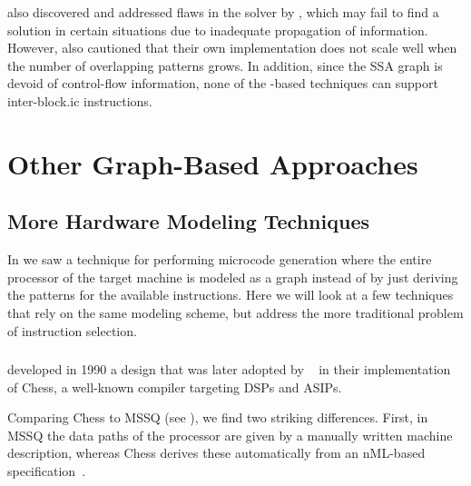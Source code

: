\citeauthor{BuchwaldZwinkau:2010} also discovered and addressed flaws in the
 solver by \citeauthor{EcksteinEtAl:2003}, which may fail to find a
solution in certain situations due to inadequate propagation of information.
%
However, \citeauthor{BuchwaldZwinkau:2010} also cautioned that their own implementation
does not scale well when the number of overlapping \glspl{pattern} grows.
%
In addition, since the \gls{SSA graph} is devoid of control-flow information,
none of the -based techniques can support \gls{inter-block.ic}
\glspl{instruction}.


\section{Other Graph-Based Approaches}

\subsection{More Hardware Modeling Techniques}

In  we saw a technique for performing \gls{microcode
  generation} where the entire processor of the \gls{target machine} is modeled
as a \gls{graph} instead of by just deriving the \glspl{pattern} for the
available \glspl{instruction}.
%
Here we will look at a few techniques that rely on the same modeling scheme, but
address the more traditional problem of \gls{instruction selection}.


\subsubsection{}

\textcite{LanneerEtAl:1990} developed in 1990 a design that was later adopted by
\citeauthor{VanPraetEtAl:1994}~\cite{VanPraetEtAl:1994, VanPraetEtAl:2001} in their
implementation of \gls{Chess}, a well-known compiler targeting \glspl{DSP} and
\glspl{ASIP}.

Comparing \gls{Chess} to \gls{MSSQ} (see
), we find two striking differences.
%
First, in \gls{MSSQ} the data paths of the processor are given by a manually
written \gls{machine description}, whereas \gls{Chess} derives these
automatically from an \mbox{\gls{nML}-based} specification~\cite{FauthEtAl:1993,
  FauthEtAl:1995}.

